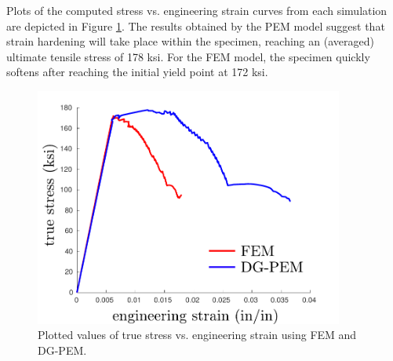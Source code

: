 
Plots of the computed stress vs. engineering strain curves from each simulation are depicted in Figure \ref{fig:tensile_stress_strain}. The results obtained by the PEM model suggest that strain hardening will take place within the specimen, reaching an (averaged) ultimate tensile stress of 178 ksi. For the FEM model, the specimen quickly softens after reaching the initial yield point at 172 ksi.

\begin{figure}[!h]
  \centering
  \includegraphics[width=4.0in]{figures/tensile_stress_strain.pdf}
  \caption{Plotted values of true stress vs. engineering strain using FEM and DG-PEM.}
  \label{fig:tensile_stress_strain}
\end{figure}


